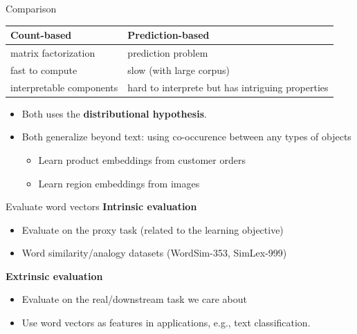 \documentclass[usenames,dvipsnames,notes,11pt,aspectratio=169]{beamer}
\begin{document}
\begin{frame}
    {Comparison}
    \begin{table}
        \begin{tabular}{p{5cm}p{7cm}}
            Count-based & Prediction-based \\
            \midrule
            matrix factorization & prediction problem \\
            fast to compute & slow (with large corpus)  \\
            interpretable components & hard to interprete but has intriguing properties
        \end{tabular}

        \begin{itemize}
            \item Both uses the \textbf{distributional hypothesis}.
            \item Both generalize beyond text: using co-occurence between any types of objects
                \begin{itemize}
                    \item Learn product embeddings from customer orders
                    \item Learn region embeddings from images
                \end{itemize}
        \end{itemize}
    \end{table}
\end{frame}

\begin{frame}
    {Evaluate word vectors}
    \textbf{Intrinsic evaluation}\\
    \begin{itemize}
        \item Evaluate on the proxy task (related to the learning objective)
        \item Word similarity/analogy datasets (\eg WordSim-353, SimLex-999)
    \end{itemize}

    \textbf{Extrinsic evaluation}\\
    \begin{itemize}
        \item Evaluate on the real/downstream task we care about
        \item Use word vectors as features in applications, e.g., text classification.
    \end{itemize}
\end{frame}
\end{document}
